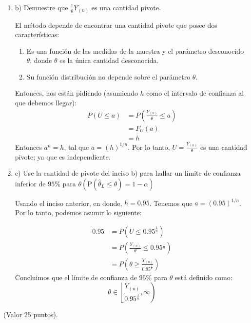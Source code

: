 \begin{enumerate}
\begin{solution}
    \end{solution}
\item b) Demuestre que $\frac{1}{\theta} Y_{(n)}$ es una cantidad pivote.
\begin{tcolorbox}[colback=gray!15,colframe=blue!10!blue,title=Sección 8.5-Intervalos de confianza - Método del Pivote]
El método depende de encontrar una cantidad pivote que posee dos características: 
\begin{enumerate}
    \item Es una función de las medidas de la muestra y el parámetro desconocido $\theta$, donde $\theta$ es la única cantidad desconocida. 
    \item Su función distribución no depende sobre el parámetro $\theta$.
\end{enumerate}
    \end{tcolorbox}
\begin{solution}
   Entonces, nos están pidiendo (asumiendo $h$ como el intervalo de confianza al que debemos llegar): 
   \begin{align*}
       P(U\leq a) &=  P\left(\frac{Y_{(n)}}{\theta}\leq a\right)\\
       &= F_U(a)\\
       &=h
   \end{align*}
   Entonces $a^n=h$, tal que $a=(h)^{1/n}$. Por lo tanto, $U=\frac{Y_{(n)}}{\theta}$ es una cantidad pivote; ya que es independiente. 
   
    \end{solution}
\item c) Use la cantidad de pivote del inciso b) para hallar un límite de confianza inferior de $95 \%$ para $\theta\left(\mathrm{P}\left(\hat{\theta}_{L} \leq \theta\right)=1-\alpha\right)$
\begin{solution}
    Usando el inciso anterior, en donde, $h=0.95$. Tenemos que $a=(0.95)^{1/n}$. Por lo tanto, podemos asumir lo siguiente:
    
    $$
\begin{aligned}
0.95 &=P\left(U \leq 0.95^{\frac{1}{n}}\right) \\
&=P\left(\frac{Y_{(n)}}{\theta} \leq 0.95^{\frac{1}{n}}\right) \\
&=P\left(\theta \geq \frac{Y_{(n)}}{0.95^{\frac{1}{n}}}\right)
\end{aligned}
$$
Concluimos que el límite de confianza de  $95 \%$ para $\theta$ está definido como:
$$
\theta \in\left\lfloor\frac{Y_{(n)}}{0.95^{\frac{1}{n}}}, \infty\right)
$$
    \end{solution}
\end{enumerate}
(Valor 25 puntos).
